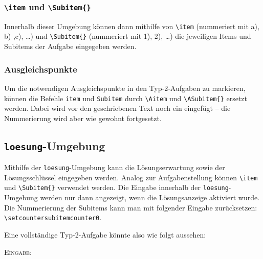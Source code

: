 \documentclass[a4paper,12pt]{article}
\begin{document}
\subsubsection{\texttt{\textbackslash item} und \texttt{\textbackslash Subitem\{\}}}
Innerhalb dieser Umgebung können dann mithilfe von \texttt{\textbackslash item} (nummeriert mit a), b) ,c), \ldots) und \texttt{\textbackslash Subitem\{\}} (nummeriert mit 1), 2), \ldots) die jeweiligen Items und Subitems der Aufgabe eingegeben werden. \leer

\subsubsection{Ausgleichspunkte}
Um die notwendigen Ausgleichspunkte in den Typ-2-Aufgaben zu markieren, können die Befehle \texttt{item} und \texttt{Subitem} durch \texttt{\textbackslash Aitem} und \texttt{\textbackslash ASubitem\{\}} ersetzt werden. Dabei wird vor den geschriebenen Text noch ein  eingefügt -- die Nummerierung wird aber wie gewohnt fortgesetzt.  

\subsection{\texttt{loesung}-Umgebung}
Mithilfe der \texttt{loesung}-Umgebung kann die Lösungserwartung sowie der Lösungsschlüssel eingegeben werden. Analog zur Aufgabenstellung können \texttt{\textbackslash item} und \texttt{\textbackslash Subitem\{\}} verwendet werden. Die Eingabe innerhalb der \texttt{loesung}-Umgebung werden nur dann angezeigt, wenn die Lösungsanzeige aktiviert wurde. Die Nummerierung der Subitems kann man mit folgender Eingabe zurücksetzen: \texttt{\textbackslash setcounter{subitemcounter}{0}}.\leer

Eine vollständige Typ-2-Aufgabe könnte also wie folgt aussehen:

\textsc{Eingabe:}
\end{document}
